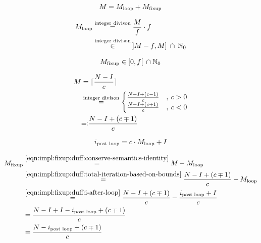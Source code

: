 \begin{equation}\label{eqn:impl:fixup:duff:conserve-semantics-identity}
\begin{aligned}
    M = M_{\text{loop}} + M_{\text{fixup}}
\end{aligned}
\end{equation}

\begin{equation}\label{eqn:impl:fixup:duff:loop-iterations}
\begin{aligned}
    M_{\text{loop}} &\overset{\text{integer divison}}{=} \frac{M}{f} \cdot f\\
    &\overset{\text{integer divison}}{\in} \medspace \rbrack M-f,M \rbrack \medspace \cap \medspace \mathbb{N}_0
\end{aligned}
\end{equation}

\begin{equation}\label{eqn:impl:fixup:duff:fixup-interval}
\begin{aligned}
    M_{\text{fixup}} \in \lbrack0, f\lbrack \medspace \medspace \cap \medspace \mathbb{N}_0
\end{aligned}
\end{equation}

\begin{equation}\label{eqn:impl:fixup:duff:total-iteration-based-on-bounds}
\begin{aligned}
    M &= \ceil{\frac{N - I}{c}} \\
    & \overset{\text{integer divison}}{=}
    \begin{cases}
        \frac{N - I + (c - 1)}{c} &, \medspace c > 0\\
        \frac{N - I + (c + 1)}{c} &, \medspace c < 0
    \end{cases}\\
    &\text{\reflectbox{$\coloneqq$}} \frac{N - I + (c \mp 1)}{c}
\end{aligned}
\end{equation}

\begin{equation}\label{eqn:impl:fixup:duff:i-after-loop}
\begin{aligned}
    i_\text{post loop} = c \cdot M_{\text{loop}} + I
\end{aligned}
\end{equation}

\begin{equation}\label{eqn:impl:fixup:duff:fixup-i}
\begin{aligned}
    M_{\text{fixup}} & \overset{\ref{eqn:impl:fixup:duff:conserve-semantics-identity}}{=} M - M_{\text{loop}} \\
    & \overset{\ref{eqn:impl:fixup:duff:total-iteration-based-on-bounds}}{=}
    \frac{N - I + (c \mp 1)}{c} - M_{\text{loop}} \\
    & \overset{\ref{eqn:impl:fixup:duff:i-after-loop}}{=}
    \frac{N - I + (c \mp 1)}{c} - \frac{i_\text{post loop} + I}{c} \\
    &= \frac{N - I + I - i_\text{post loop} + (c \mp 1)}{c}\\
    &= \frac{N - i_\text{post loop} + (c \mp 1)}{c}
\end{aligned}
\end{equation}

